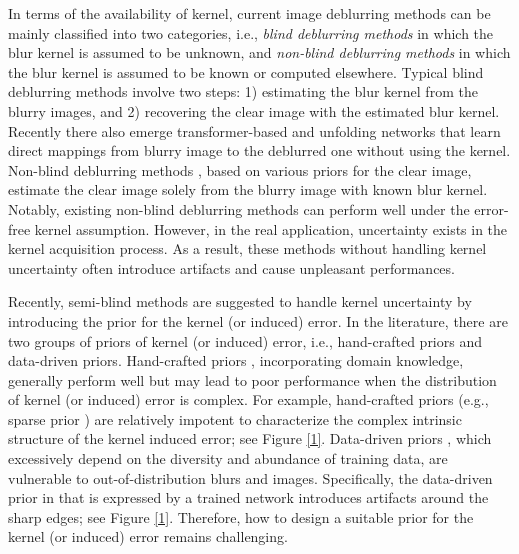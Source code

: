\documentclass[10pt,twocolumn,letterpaper]{article}
\begin{document}
	In terms of the availability of kernel, current image deblurring methods can be mainly classified into two categories, i.e., {\it  blind deblurring methods} in which  the blur kernel is assumed to be unknown, and {\it  non-blind deblurring methods} in which the blur kernel is assumed to be known or computed elsewhere. Typical blind deblurring methods \cite{levin2009understanding, liu2014blind,michaeli2014blind,pan2016blind,ren2016image,sun2013edge,yan2017image, liu2021surface, zuo2016learning, li2022supervised} involve two steps: 1) estimating the blur kernel from the blurry images, and 2) {recovering} the clear image with the estimated blur kernel. Recently there also emerge transformer-based \cite{zamir2022restormer, wang2022general} and unfolding networks \cite{mou2022deep} that learn  direct mappings from blurry image to the deblurred one without using the kernel. Non-blind deblurring methods \cite{wang2008new, krishnan2009fast, 6392274, zhang2017learning1, eboli2020end2end, chen2021learning, dong2021dwdn, quan2021nonblind}, based on various priors for the clear image,  estimate the clear image solely from the blurry image with known blur kernel. Notably, existing non-blind deblurring methods can perform well under the error-free kernel assumption. However, in the real application, uncertainty exists in the kernel acquisition process. As a result, these methods without handling kernel uncertainty often introduce artifacts and cause unpleasant performances.
	
	Recently, semi-blind methods are suggested to handle kernel uncertainty by introducing the prior for the kernel (or induced) error. In the literature, there are two groups of  priors of kernel (or induced) error, i.e., hand-crafted priors and data-driven priors. Hand-crafted priors \cite{ji2011robust, Zhao2013TotalVS}, incorporating domain knowledge, generally perform well but may lead to poor performance when the distribution of kernel (or induced) error is complex. For example, hand-crafted priors (e.g., sparse prior \cite{ji2011robust}) are relatively impotent to characterize the complex intrinsic structure of the kernel induced error; see Figure \ref{1}. Data-driven priors \cite{vasu2018non, nan2020deep, ren2019simultaneous}, which excessively depend on the diversity and abundance of training data, are vulnerable to out-of-distribution blurs and images. Specifically, the data-driven prior in \cite{vasu2018non} that is expressed by a trained network  introduces artifacts around the sharp edges; see Figure \ref{1}. Therefore, how to design a suitable prior for the kernel (or induced) error remains challenging.
	
\end{document}
